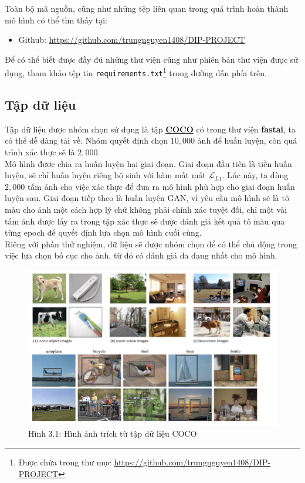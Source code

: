 \documentclass[a4paper]{article}
\begin{document}
\noindent
Toàn bộ mã nguồn, cũng như những tệp liên quan trong quá trình hoàn thành mô hình có thể tìm thấy tại:
\begin{itemize}
    \item Github: \href{https://github.com/trungnguyen1408/DIP-PROJECT}{https://github.com/trungnguyen1408/DIP-PROJECT}
\end{itemize}
Để có thể biết được đầy đủ những thư viện cũng như phiên bản thư viện được sử dụng, tham khảo tệp tin \texttt{requirements.txt}\footnote{Được chứa trong thư mục \href{https://github.com/trungnguyen1408/DIP-PROJECT}{https://github.com/trungnguyen1408/DIP-PROJECT}} trong đường dẫn phía trên.

\subsection{Tập dữ liệu}
Tập dữ liệu được nhóm chọn sử dụng là tập \href{https://cocodataset.org/#download}{\textbf{COCO}} có trong thư viện \textbf{fastai}, ta có thể dễ dàng tải về. Nhóm quyết định chọn $10,000$ ảnh để huấn luyện, còn quá trình xác thực sẽ là $2,000$.\\
Mô hình được chia ra huấn luyện hai giai đoạn. Giai đoạn đầu tiên là tiền huấn luyện, sẽ chỉ huấn luyện riêng bộ sinh với hàm mất mát $\mathcal{L}_{L1}$. Lúc này, ta dùng $2,000$ tấm ảnh cho việc xác thực để đưa ra mô hình phù hợp cho giai đoạn huấn luyện sau. Giai đoạn tiếp theo là huấn luyện GAN, vì yêu cầu mô hình sẽ là  tô màu cho ảnh một cách hợp lý chứ không phải chính xác tuyệt đối, chỉ một vài tấm ảnh được lấy ra trong tập xác thực sẽ được đánh giá kết quả tô màu qua từng epoch để quyết định lựa chọn mô hình cuối cùng.\\
Riêng với phần thử nghiệm, dữ liệu sẽ được nhóm chọn để có thể chủ động trong việc lựa chọn bố cục cho ảnh, từ đó có đánh giá đa dạng nhất cho mô hình.

\begin{figure}[h!]
\centering
\includegraphics[width=12cm]{images/3_1.png}
\caption{Hình 3.1: Hình ảnh trích từ tập dữ liệu COCO}
\end{figure}
\end{document}

